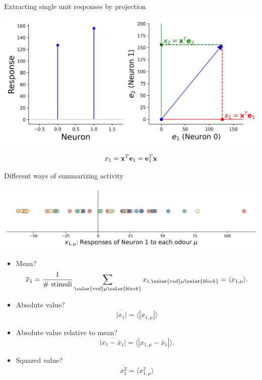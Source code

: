 \documentclass[presentation,smaller]{beamer}
\begin{document}
\begin{frame}[label={sec:org62c26cd}]{Extracting single unit responses by projection}
\begin{center}
\includegraphics[width=1.0\textwidth]{figures/projections.png}
\end{center}
  $$ x_1 = \mathbf{x}^T \mathbf e_1 = \mathbf e_1^T \mathbf{x} $$
\end{frame}
\begin{frame}[label={sec:orgfe18c5e}]{Different ways of summarizing activity}
\begin{center}
\includegraphics[width=1.0\textwidth]{figures/neuron0.png}
\end{center}  
\begin{itemize}
\item Mean?
$$ \overline{x}_1 = {1 \over \text{\# stimuli}} \sum_{\color{red}\mu\color{black}} x_{1,\color{red}\mu\color{black}} = \langle x_{1,\mu} \rangle.$$
\item Absolute value? $$\overline{|x_1|} = \langle |x_{1,\mu}| \rangle$$
\item Absolute value relative to mean?
$$ \overline{|x_1 - \overline{x}_1|} = \langle |x_{1,\mu} - \overline{x}_1 | \rangle.$$
\item Squared value?
$$ \overline{x^2_1} = \langle x^2_{1,\mu} \rangle$$
\end{itemize}
\end{frame}
\end{document}
